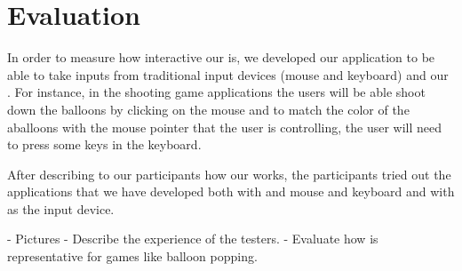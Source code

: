 \section{Evaluation}\label{sec:eval}
In order to measure how interactive our \tube is, we developed our application to be able to take inputs from traditional input devices (\ie mouse and keyboard) and our \tube. For instance, in the shooting game applications the users will be able shoot down the balloons by clicking on the mouse and to match the color of the aballoons with the mouse pointer that the user is controlling, the user will need to press some keys in the keyboard.

After describing to our participants how our \tube works, the participants tried out the applications that we have developed both with and mouse and keyboard and with \tube as the input device.

\TODO
- Pictures \newline
- Describe the experience of the testers. \newline
- Evaluate how \tube is representative for games like balloon popping.
